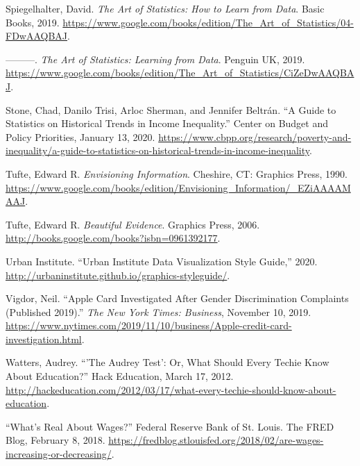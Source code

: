 \documentclass[
  english,
]{book}
\newlength{\cslhangindent}
\newlength{\cslentryspacingunit} %
\newenvironment{CSLReferences}[2] %
 {%
  \setlength{\parindent}{0pt}
  \ifodd #1
  \let\oldpar\par
  \def\par{\hangindent=\cslhangindent\oldpar}
  \fi
  \setlength{\parskip}{#2\cslentryspacingunit}
 }%
 {}
\begin{document}
\begin{CSLReferences}{1}{0}
\leavevmode{}%
Spiegelhalter, David. \emph{The {Art} of {Statistics}: {How} to {Learn} from {Data}}. {Basic Books}, 2019. \url{https://www.google.com/books/edition/The_Art_of_Statistics/04-FDwAAQBAJ}.

\leavevmode{}%
---------. \emph{The {Art} of {Statistics}: {Learning} from {Data}}. {Penguin UK}, 2019. \url{https://www.google.com/books/edition/The_Art_of_Statistics/CiZeDwAAQBAJ}.

\leavevmode{}%
Stone, Chad, Danilo Trisi, Arloc Sherman, and Jennifer Beltrán. {``A {Guide} to {Statistics} on {Historical Trends} in {Income Inequality}.''} {Center on Budget and Policy Priorities}, January 13, 2020. \url{https://www.cbpp.org/research/poverty-and-inequality/a-guide-to-statistics-on-historical-trends-in-income-inequality}.

\leavevmode{}%
Tufte, Edward R. \emph{Envisioning {Information}}. {Cheshire, CT}: {Graphics Press}, 1990. \url{https://www.google.com/books/edition/Envisioning_Information/_EZiAAAAMAAJ}.

\leavevmode{}%
Tufte, Edward R. \emph{Beautiful {Evidence}}. {Graphics Press}, 2006. \url{http://books.google.com/books?isbn=0961392177}.

\leavevmode{}%
Urban Institute. {``Urban {Institute Data Visualization Style Guide},''} 2020. \url{http://urbaninstitute.github.io/graphics-styleguide/}.

\leavevmode{}%
Vigdor, Neil. {``Apple {Card Investigated After Gender Discrimination Complaints} ({Published} 2019).''} \emph{The New York Times: Business}, November 10, 2019. \url{https://www.nytimes.com/2019/11/10/business/Apple-credit-card-investigation.html}.

\leavevmode{}%
Watters, Audrey. {``'{The Audrey Test}': {Or}, {What Should Every Techie Know About Education}?''} {Hack Education}, March 17, 2012. \url{http://hackeducation.com/2012/03/17/what-every-techie-should-know-about-education}.

\leavevmode{}%
{``What's {Real About Wages}?''} Federal Reserve Bank of St. Louis. {The FRED Blog}, February 8, 2018. \url{https://fredblog.stlouisfed.org/2018/02/are-wages-increasing-or-decreasing/}.


\end{CSLReferences}
\end{document}
